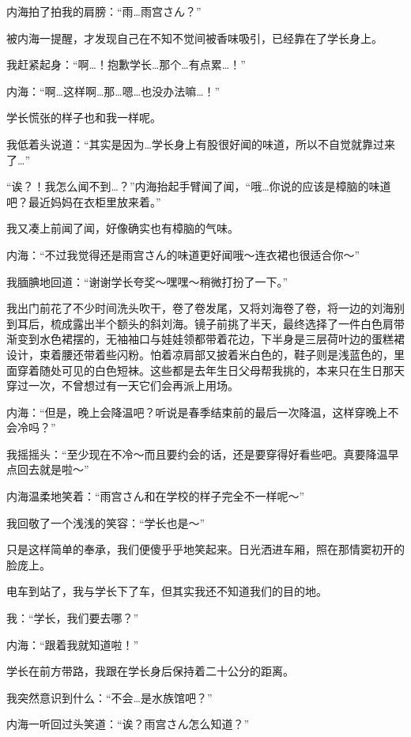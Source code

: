 内海拍了拍我的肩膀：“雨…雨宫さん？”

被内海一提醒，才发现自己在不知不觉间被香味吸引，已经靠在了学长身上。

我赶紧起身：“啊…！抱歉学长…那个…有点累…！”

内海：“啊…这样啊…那…嗯…也没办法嘛…！”

学长慌张的样子也和我一样呢。

我低着头说道：“其实是因为…学长身上有股很好闻的味道，所以不自觉就靠过来了…”

“诶？！我怎么闻不到…？”内海抬起手臂闻了闻，“哦…你说的应该是樟脑的味道吧？最近妈妈在衣柜里放来着。”

我又凑上前闻了闻，好像确实也有樟脑的气味。

内海：“不过我觉得还是雨宫さん的味道更好闻哦～连衣裙也很适合你～”

我腼腆地回道：“谢谢学长夸奖～嘿嘿～稍微打扮了一下。”



我出门前花了不少时间洗头吹干，卷了卷发尾，又将刘海卷了卷，将一边的刘海别到耳后，梳成露出半个额头的斜刘海。镜子前挑了半天，最终选择了一件白色肩带渐变到水色裙摆的，无袖袖口与娃娃领都带着花边，下半身是三层荷叶边的蛋糕裙设计，束着腰还带着些闪粉。怕着凉肩部又披着米白色的，鞋子则是浅蓝色的，里面穿着随处可见的白色短袜。这些都是去年生日父母帮我挑的，本来只在生日那天穿过一次，不曾想过有一天它们会再派上用场。


内海：“但是，晚上会降温吧？听说是春季结束前的最后一次降温，这样穿晚上不会冷吗？”

我摇摇头：“至少现在不冷～而且要约会的话，还是要穿得好看些吧。真要降温早点回去就是啦～”

内海温柔地笑着：“雨宫さん和在学校的样子完全不一样呢～”

我回敬了一个浅浅的笑容：“学长也是～”

只是这样简单的奉承，我们便傻乎乎地笑起来。日光洒进车厢，照在那情窦初开的脸庞上。

电车到站了，我与学长下了车，但其实我还不知道我们的目的地。

我：“学长，我们要去哪？”

内海：“跟着我就知道啦！”

学长在前方带路，我跟在学长身后保持着二十公分的距离。

我突然意识到什么：“不会…是水族馆吧？”

内海一听回过头笑道：“诶？雨宫さん怎么知道？”

